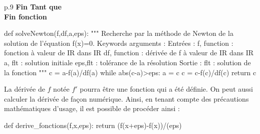 \documentclass[10pt]{article}
\begin{document}
\begin{minipage}[c]{.48\linewidth}
\begin{pseudo}
\begin{center}
\begin{tabular}{p{.9\textwidth}}
\hspace{.4cm} \textbf{Fin Tant que}\\
\textbf{Fin fonction} \\
\hline
\end{tabular}
\end{center}
\end{pseudo}
\end{minipage} \hfill
\begin{minipage}[c]{.48\linewidth}
\begin{py}
\begin{python}
def solveNewton(f,df,a,eps):
    """
    Recherche par la méthode de Newton de la solution 
    de l'équation f(x)=0.
    Keywords arguments :
    Entrées :
        f, function : fonction à valeur de IR dans IR
        df, function : dérivée de f à valeur de IR dans IR
        a, flt : solution initiale
        eps,flt : tolérance de la résolution
    Sortie : 
        flt : solution de la fonction    
    """
    c = a-f(a)/df(a)
    while abs(c-a)>eps:
        a = c
        c = c-f(c)/df(c)
    return c
\end{python}
\end{py}
\end{minipage} 

\begin{rem}
La dérivée de $f$ notée $f'$ pourra être une fonction qui a été définie. On peut aussi calculer la dérivée de façon numérique. Ainsi, en tenant compte des précautions mathématiques d'usage, il est possible de procéder ainsi :

\begin{py}
\begin{python}
def derive_fonctions(f,x,eps):
    return (f(x+eps)-f(x))/(eps)
\end{python}
\end{py}
\end{rem}


\end{document}
